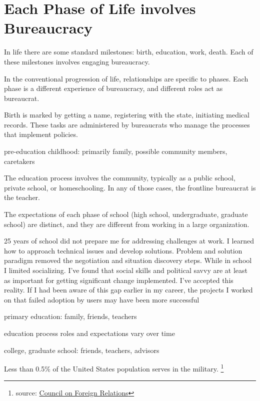 \section{Each Phase of Life involves Bureaucracy}
In life there are some standard milestones: birth, education, work, death. Each of these milestones involves engaging bureaucracy. 

In the conventional progression of life, relationships are specific to phases. Each phase is a different experience of bureaucracy, and different roles act as bureaucrat. 


Birth is marked by getting a name, registering with the state, initiating medical records. These tasks are administered by bureaucrats who manage the processes that implement policies. 

pre-education childhood: primarily family, possible community members, caretakers


The education process involves the community, typically as a public school, private school, or homeschooling. In any of those cases, the frontline bureaucrat is the teacher. 


The expectations of each phase of school (high school, undergraduate, graduate school) are distinct, and they are different from working in a large organization. 

25 years of school did not prepare me for addressing challenges at work. I learned how to approach technical issues and develop solutions. Problem and solution paradigm removed the negotiation and situation discovery steps. While in school I limited socializing. I've found that social skills and political savvy are at least as important for getting significant change implemented.  I've accepted this reality. If I had been aware of this gap earlier in my career, the projects I worked on that failed adoption by users may have been more successful



primary education: family, friends, teachers


 education process roles and expectations vary over time

college, graduate school: friends, teachers, advisors



Less than 0.5\% of the United States population serves in the military. \footnote{source: \href{https://www.cfr.org/backgrounder/demographics-us-military}{Council on Foreign Relations}}

